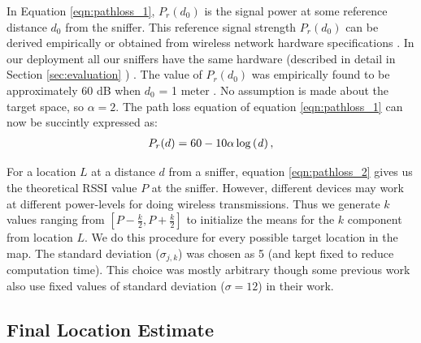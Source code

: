 In Equation \ref{eqn:pathloss_1},  $P_r({d_0})$ is the signal power at
some reference distance $d_{0}$ from the sniffer. This reference signal
strength $P_r({d_0})$ can be derived empirically or obtained from
wireless network hardware specifications \cite{Bahl00radar:an}. In our
deployment all our sniffers have the same hardware (described in detail
		in Section \ref {sec:evaluation} ) . The value of $P_r({d_0})$
was empirically found to be approximately 60 dB when $d_{0}$ = 1 meter . No assumption is made about the
target space, so $\alpha =2$. The path loss equation of equation
\ref{eqn:pathloss_1} can now be succintly expressed as: 
\begin{align}
P_r(d) = 60 - 10\alpha\log\left({\it d} \right)
	\label{eqn:pathloss_2},
\end{align}
 
For a location $L$ at a distance $d$ from a sniffer, equation
\ref{eqn:pathloss_2} gives us the theoretical RSSI value $P$ at the
sniffer. However, different devices may work at different power-levels
for doing wireless transmissions. Thus we generate $k$ values ranging from
$[P-\frac{k}{2} , P+\frac{k}{2}]$ to initialize the means for the $k$
component from location $L$. We do this procedure for every possible
target location in the map.  The standard deviation ($\sigma_{j, k}$)
	was chosen as 5 (and kept fixed to reduce computation time). This
	choice was mostly arbitrary though some previous work
	\cite{Tao:2003:WLL:941311.941314} also use fixed values of standard
	deviation ($\sigma=12$) in
	their work. 

\subsection{Final Location Estimate}
\label{subsec:finallocationestimate}

